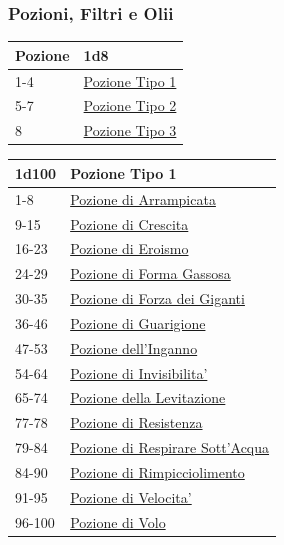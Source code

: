\begin{multicols}{2}
{\subsubsection{Pozioni, Filtri e Olii}\hypertarget{pozionifiltri}{}\label{pozionifiltri}

{\small\begin{tabularx}{\linewidth}{ll}
		\toprule
\textbf{Pozione}&\textbf{1d8}\\
\toprule
 1-4&\hyperlink{pozionifiltri}{Pozione Tipo 1}\\
 5-7&\hyperlink{pozionifiltri}{Pozione Tipo 2}\\
 8  &\hyperlink{pozionifiltri}{Pozione Tipo 3}
\end{tabularx}}

\medskip\hypertarget{Pozione Tipo 1}{}

{\small\begin{tabularx}{\linewidth}{ll}
		\toprule
\textbf{1d100} & \textbf{Pozione Tipo 1}\\
\toprule
1-8 & \hyperlink{Pozione di Arrampicata}{Pozione di Arrampicata}\\
9-15 & \hyperlink{Pozione di Crescita}{Pozione di Crescita}\\
16-23 & \hyperlink{Pozione di Eroismo}{Pozione di Eroismo}\\
24-29 & \hyperlink{Pozione di FormaGassosa}{Pozione di Forma Gassosa}\\
30-35 & \hyperlink{Pozione di ForzadeiGiganti}{Pozione di Forza dei Giganti}\\
36-46 & \hyperlink{Pozione di Guarigione}{Pozione di Guarigione}\\
47-53 & \hyperlink{Pozione dell'Inganno}{Pozione dell'Inganno}\\
54-64 & \hyperlink{Pozione di Invisibilita'}{Pozione di Invisibilita'}\\
65-74 & \hyperlink{Pozione della Levitazione}{Pozione della Levitazione}\\
77-78 & \hyperlink{Pozione di Resistenza}{Pozione di Resistenza}\\
79-84 & \hyperlink{Pozione di RespirareSott'Acqua}{Pozione di Respirare Sott'Acqua}\\
84-90 & \hyperlink{Pozione di Rimpicciolimento}{Pozione di Rimpicciolimento}\\
91-95 & \hyperlink{Pozione di Velocita'}{Pozione di Velocita'}\\
96-100 & \hyperlink{Pozione di Volo}{Pozione di Volo}
\end{tabularx}}

}
\end{multicols}
